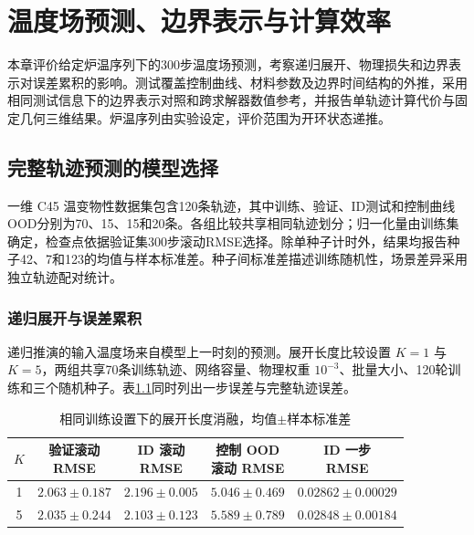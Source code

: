 \chapter{温度场预测、边界表示与计算效率}

本章评价给定炉温序列下的300步温度场预测，考察递归展开、物理损失和边界表示对误差累积的影响。测试覆盖控制曲线、材料参数及边界时间结构的外推，采用相同测试信息下的边界表示对照和跨求解器数值参考，并报告单轨迹计算代价与固定几何三维结果。炉温序列由实验设定，评价范围为开环状态递推。

\section{完整轨迹预测的模型选择}

一维 C45 温变物性数据集包含120条轨迹，其中训练、验证、ID测试和控制曲线OOD分别为70、15、15和20条。各组比较共享相同轨迹划分；归一化量由训练集确定，检查点依据验证集300步滚动RMSE选择。除单种子计时外，结果均报告种子42、7和123的均值与样本标准差。种子间标准差描述训练随机性，场景差异采用独立轨迹配对统计。

\subsection{递归展开与误差累积}

递归推演的输入温度场来自模型上一时刻的预测。展开长度比较设置 $K=1$ 与 $K=5$，两组共享70条训练轨迹、网络容量、物理权重 $10^{-3}$、批量大小、120轮训练和三个随机种子。表\ref{tab:unroll_ablation}同时列出一步误差与完整轨迹误差。

\begin{table}[H]
  \centering
  \caption{相同训练设置下的展开长度消融，均值$\pm$样本标准差}
  \label{tab:unroll_ablation}
  \small
  \begin{tabular}{ccccc}
    \toprule
    $K$ & \shortstack{验证滚动\\RMSE} & \shortstack{ID 滚动\\RMSE} & \shortstack{控制 OOD\\滚动 RMSE} & \shortstack{ID 一步\\RMSE} \\
    \midrule
    1 & $2.063\pm0.187$ & $2.196\pm0.005$ & $\mathbf{5.046\pm0.469}$ & $0.02862\pm0.00029$ \\
    5 & $\mathbf{2.035\pm0.244}$ & $\mathbf{2.103\pm0.123}$ & $5.589\pm0.789$ & $0.02848\pm0.00184$ \\
    \bottomrule
  \end{tabular}
\end{table}

